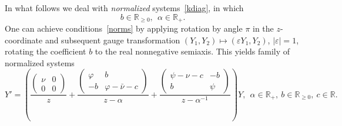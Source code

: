 \documentclass[preprint,12pt]{elsarticle}
\theoremstyle{plain}
\renewcommand{\phi}{\varphi}
\def\a{\alpha}
\def\ba{\bar\alpha}
\def\bam{\ba^{-1}}
\numberwithin{equation}{section}
\numberwithin{equation}{section}
\begin{document}
In what follows we deal with {\it normalized} systems~\eqref{kdiag}, in which 
\begin{equation}  b\in\mathbb{R}_{\geq0}, \ \ \a\in\mathbb{R}_+.\label{norms}\end{equation}
One can achieve conditions~\eqref{norms} by applying rotation by angle $\pi$ in the $z$-coordinate  and subsequent gauge transformation $(Y_1,Y_2)\mapsto(\varepsilon Y_1,Y_2)$, $|\varepsilon|=1$, rotating the coefficient $b$ to the real nonnegative semiaxis. This yields family of normalized systems 
\begin{equation} Y'=\left(\frac{\left(\begin{matrix}\nu & 0\\ 0 & 0\end{matrix}\right)}z+
\frac{\left(\begin{matrix}\phi & b\\ -b & \phi-\bar\nu-c\end{matrix}\right)}{z-\alpha}  + \frac{\left(\begin{matrix}\psi-\nu-c & 
-b\\  b & \psi\end{matrix}\right)}{z-\alpha^{-1}}\right)Y, \ \ \a\in\mathbb{R}_+, \   b\in\mathbb{R}_{\geq0}, \   c\in\mathbb{R}.  \label{kd}\end{equation}

\def\bam{\a^{-1}}
\end{document}
